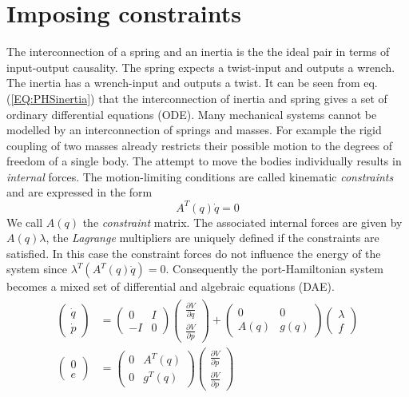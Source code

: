 \documentclass[a4paper,twoside, openright,12pt]{report}
\begin{document}
\section{Imposing constraints}
The interconnection of a spring and an inertia is the the ideal pair in terms of input-output causality. The spring expects a twist-input and outputs a wrench. The inertia has a wrench-input and outputs a twist. It can be seen from eq. (\ref{EQ:PHSinertia}) that the interconnection of inertia and spring gives a set of ordinary differential equations (ODE). Many mechanical systems cannot be modelled by an interconnection of springs and masses. For example the rigid coupling of two masses already restricts their possible motion to the degrees of freedom of a single body. The attempt to  move the bodies individually results in \emph{internal} forces. The motion-limiting conditions are called kinematic \emph{constraints} and are expressed in the form
\begin{equation}
A^T(q)\dot{q}=0
\end{equation}
We call $A(q)$ the \emph{constraint} matrix. The associated internal forces are given by $A(q)\lambda$, the \emph{Lagrange} multipliers are uniquely defined if the constraints are satisfied. In this case the constraint forces do not influence the energy of the system since $\lambda^T (A^T(q)\dot{q}) = 0$. Consequently the port-Hamiltonian system becomes a mixed set of differential and algebraic equations (DAE).
\begin{eqnarray}\label{EQ:PHSpconstrained}
\begin{aligned}
\begin{pmatrix}
\dot{q} \\ \dot{p} \end{pmatrix} &= 
\begin{pmatrix} 0 & I \\ -I & 0\end{pmatrix}
\begin{pmatrix}
\frac{\partial V}{\partial q} \\ \frac{\partial V}{\partial p}\end{pmatrix}
+ \begin{pmatrix}0 & 0 \\ A(q) & g(q)\end{pmatrix}
\begin{pmatrix}\lambda \\ f\end{pmatrix}
\\
\begin{pmatrix}0 \\ e\end{pmatrix} &=
\begin{pmatrix}0 & A^T(q) \\ 0 & g^T(q)\end{pmatrix}
\begin{pmatrix}
\frac{\partial V}{\partial p} \\ \frac{\partial V}{\partial p}\end{pmatrix}
\end{aligned}
\end{eqnarray}
\end{document}
